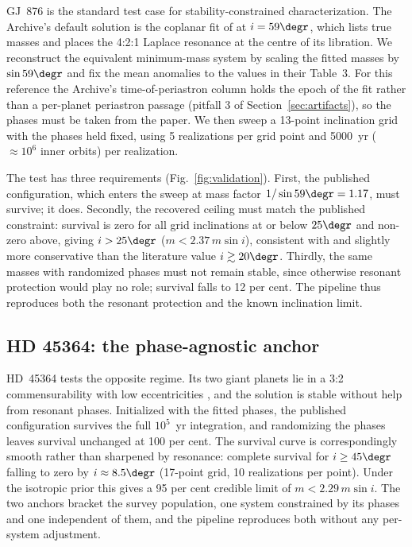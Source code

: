 \documentclass[fleqn,usenatbib]{mnras}
\newcommand{\msini}{m\sin i}
\begin{document}
GJ~876 is the standard test case for stability-constrained
characterization. The Archive's default solution is the coplanar fit of
\citet{Rivera2010} at $i = 59\degr$, which lists true masses and places
the 4:2:1 Laplace resonance at the centre of its libration. We reconstruct
the equivalent minimum-mass system by scaling the fitted masses by
$\sin 59\degr$ and fix the mean anomalies to the values in their Table~3.
For this reference the Archive's time-of-periastron column holds the epoch
of the fit rather than a per-planet periastron passage (pitfall 3 of
Section~\ref{sec:artifacts}), so the phases must be taken from the paper.
We then sweep a 13-point inclination grid with the phases held fixed,
using 5 realizations per grid point and 5000~yr ($\approx 10^6$ inner
orbits) per realization.

The test has three requirements (Fig.~\ref{fig:validation}). First, the
published configuration, which enters the sweep at mass factor
$1/\sin 59\degr = 1.17$, must survive; it does. Secondly, the recovered
ceiling must match the published constraint: survival is zero for all grid
inclinations at or below $25\degr$ and non-zero above, giving
$i > 25\degr$ ($m < 2.37\,\msini$), consistent with and slightly more
conservative than the literature value $i \gtrsim 20\degr$. Thirdly, the
same masses with randomized phases must not remain stable, since otherwise
resonant protection would play no role; survival falls to 12 per cent. The
pipeline thus reproduces both the resonant protection and the known
inclination limit.

\subsection{HD 45364: the phase-agnostic anchor} \label{sec:hd45364}

HD~45364 tests the opposite regime. Its two giant planets lie in a 3:2
commensurability with low eccentricities \citep{Correia2009}, and the
\citet{Li2022} solution is stable without help from resonant phases.
Initialized with the fitted phases, the published configuration survives
the full $10^5$~yr integration, and randomizing the phases leaves survival
unchanged at 100 per cent. The survival curve is correspondingly smooth
rather than sharpened by resonance: complete survival for $i \ge 45\degr$
falling to zero by $i \approx 8.5\degr$ (17-point grid, 10 realizations
per point). Under the isotropic prior this gives a 95 per cent credible
limit of $m < 2.29\,\msini$. The two anchors bracket the survey
population, one system constrained by its phases and one independent of
them, and the pipeline reproduces both without any per-system adjustment.
\end{document}
